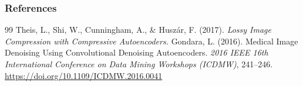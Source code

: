 \documentclass[11pt,compress,t,notes=noshow, xcolor=table]{beamer}
\begin{document}
\begin{vbframe}
\frametitle{References}
\footnotesize{
\begin{thebibliography}{99}
 Theis, L., Shi, W., Cunningham, A., \& Huszár, F. (2017). \textit{Lossy Image Compression with Compressive Autoencoders.}
 Gondara, L. (2016). Medical Image Denoising Using Convolutional Denoising Autoencoders. \textit{2016 IEEE 16th International Conference on Data Mining Workshops (ICDMW)}, 241–246. \url{https://doi.org/10.1109/ICDMW.2016.0041}

\end{thebibliography}
}
\end{vbframe}


\endlecture
\end{document}
